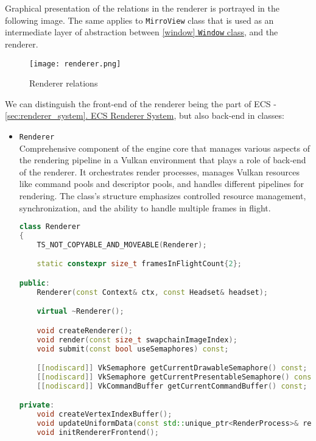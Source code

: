 Graphical presentation of the relations in the renderer is portrayed in the following image.
The same applies to \texttt{MirroView} class that is used as an intermediate layer of abstraction between \hyperref[window]{\ref*{window} \texttt{Window} class}, and the renderer.
\label{fig:renderer}
\begin{figure}[H]
  \texttt{[image: renderer.png]}
  \caption{Renderer relations}
\end{figure}
\newpage
We can distinguish the front-end of the renderer being the part of ECS - \hyperref[sec:renderer_system]{\ref*{sec:renderer_system}. ECS Renderer System}, but also back-end in classes:
\begin{itemize}
    \item \texttt{Renderer}\\
    Comprehensive component of the engine core that manages various aspects of the rendering pipeline in a Vulkan environment that plays a role of back-end of the renderer. It orchestrates render processes, manages Vulkan resources like command pools and descriptor pools, and handles different pipelines for rendering. The class's structure emphasizes controlled resource management, synchronization, and the ability to handle multiple frames in flight.
\begin{lstlisting}[language=c++, caption=\texttt{Renderer} class (./engine/src/core/renderer.h)]
class Renderer
{
    TS_NOT_COPYABLE_AND_MOVEABLE(Renderer);

    static constexpr size_t framesInFlightCount{2};

public:
    Renderer(const Context& ctx, const Headset& headset);

    virtual ~Renderer();

    void createRenderer();
    void render(const size_t swapchainImageIndex);
    void submit(const bool useSemaphores) const;

    [[nodiscard]] VkSemaphore getCurrentDrawableSemaphore() const;
    [[nodiscard]] VkSemaphore getCurrentPresentableSemaphore() const;
    [[nodiscard]] VkCommandBuffer getCurrentCommandBuffer() const;

private:
    void createVertexIndexBuffer();
    void updateUniformData(const std::unique_ptr<RenderProcess>& renderProcess);
    void initRendererFrontend();


\end{lstlisting}
\end{itemize}
